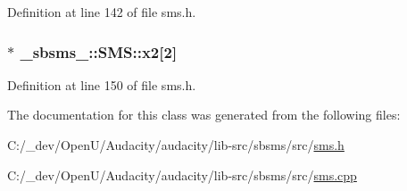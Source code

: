 Definition at line 142 of file sms.\+h.

\subsubsection[{\texorpdfstring{x2}{x2}}]{$\ast$ \+\_\+sbsms\+\_\+\+::\+S\+M\+S\+::x2\mbox{[}2\mbox{]}\hspace{0.3cm}{\ttfamily [protected]}}\hypertarget{class__sbsms___1_1_s_m_s_a6a664bbfc377d06c89c4ad104d9e137d}{}\label{class__sbsms___1_1_s_m_s_a6a664bbfc377d06c89c4ad104d9e137d}


Definition at line 150 of file sms.\+h.



The documentation for this class was generated from the following files\+:\begin{DoxyCompactItemize}
\item 
C\+:/\+\_\+dev/\+Open\+U/\+Audacity/audacity/lib-\/src/sbsms/src/\hyperlink{sms_8h}{sms.\+h}\item 
C\+:/\+\_\+dev/\+Open\+U/\+Audacity/audacity/lib-\/src/sbsms/src/\hyperlink{sms_8cpp}{sms.\+cpp}\end{DoxyCompactItemize}
